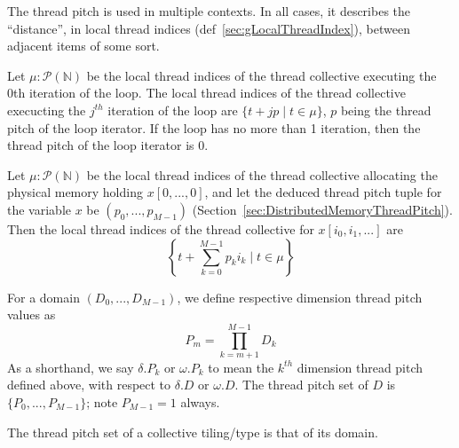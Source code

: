
The thread pitch is used in multiple contexts.
In all cases, it describes the ``distance'', in local thread indices (def~\ref{sec:gLocalThreadIndex}), between adjacent items of some sort.

 Let $\mu: \mathcal{P}(\mathbb{N})$ be the local thread indices of the thread collective executing the 0th iteration of the loop.
The local thread indices of the thread collective execucting the $j^{th}$ iteration of the loop are $\{t + jp \mid t \in \mu\}$, $p$ being the thread pitch of the loop iterator.
If the loop has no more than 1 iteration, then the thread pitch of the loop iterator is 0.

 Let $\mu: \mathcal{P}(\mathbb{N})$ be the local thread indices of the thread collective allocating the physical memory holding $x[0, ..., 0]$, and let the deduced thread pitch tuple for the variable $x$ be $(p_0, ..., p_{M-1})$ (Section~\ref{sec:DistributedMemoryThreadPitch}).
Then the local thread indices of the thread collective for $x[i_0, i_1, ...]$ are
\begin{equation*}
  \left \{ t + \sum_{k=0}^{M-1} p_k i_k \mid t \in \mu \right \}
\end{equation*}

 For a domain $(D_0, ..., D_{M-1})$, we define respective dimension thread pitch values as
\begin{equation*}
    P_m = \prod_{k=m+1}^{M-1} D_k
\end{equation*}
As a shorthand, we say $\delta.P_k$ or $\omega.P_k$ to mean the $k^{th}$ dimension thread pitch defined above, with respect to $\delta.D$ or $\omega.D$.
The thread pitch set of $D$ is $\{P_0, ..., P_{M-1}\}$; note $P_{M-1} = 1$ always.

 The thread pitch set of a collective tiling/type is that of its domain.

